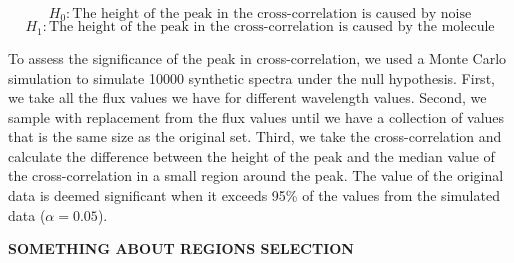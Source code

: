 \documentclass[twoside, single, authoryear, semicolon]{lion-msc}
\newcommand{\3}{$_3$}
\newcommand{\2}{$_2$}
\begin{document}
\begin{equation}
    H_0: \text{The height of the peak in the cross-correlation is caused by noise}
\end{equation}
\begin{equation}
    H_1: \text{The height of the peak in the cross-correlation is caused by the molecule}
\end{equation}

To assess the significance of the peak in cross-correlation, we used a Monte Carlo simulation to simulate 10000 synthetic spectra under the null hypothesis. First, we take all the flux values we have for different wavelength values. Second, we sample with replacement from the flux values until we have a collection of values that is the same size as the original set. Third, we take the cross-correlation and calculate the difference between the height of the peak and the median value of the cross-correlation in a small region around the peak. The value of the original data is deemed significant when it exceeds 95\% of the values from the simulated data ($\alpha=0.05$).

\textbf{SOMETHING ABOUT REGIONS SELECTION}
\end{document}
